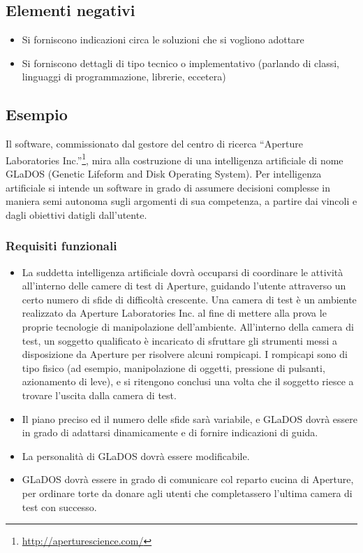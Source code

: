 \documentclass[a4paper,12pt]{report}
\begin{document}
\subsection*{Elementi negativi}
\begin{itemize}
	\item Si forniscono indicazioni circa le soluzioni che si vogliono adottare
	\item Si forniscono dettagli di tipo tecnico o implementativo (parlando di classi, linguaggi di programmazione, librerie, eccetera)
\end{itemize}

\subsection*{Esempio}
Il software, commissionato dal gestore del centro di ricerca ``Aperture Laboratories Inc.''\footnote{\url{http://aperturescience.com/}}, mira alla costruzione di una intelligenza artificiale di nome GLaDOS (Genetic Lifeform and Disk Operating System).
%
Per intelligenza artificiale si intende un software in grado di assumere decisioni complesse in maniera semi autonoma sugli argomenti di sua competenza, a partire dai vincoli e dagli obiettivi datigli dall'utente.

\subsubsection{Requisiti funzionali}
\begin{itemize}
	\item La suddetta intelligenza artificiale dovrà occuparsi di coordinare le attività all'interno
delle camere di test di Aperture, guidando l'utente attraverso un certo numero di sfide di
difficoltà crescente. Una camera di test è un ambiente realizzato da Aperture Laboratories Inc. al
fine di mettere alla prova le proprie tecnologie di manipolazione dell'ambiente. All'interno della
camera di test, un soggetto qualificato è incaricato di sfruttare gli strumenti messi a
disposizione da Aperture per risolvere alcuni rompicapi. I rompicapi sono di tipo fisico (ad
esempio, manipolazione di oggetti, pressione di pulsanti, azionamento di leve), e si ritengono
conclusi una volta che il soggetto riesce a trovare l'uscita dalla camera di test.
	\item Il piano preciso ed il numero delle sfide sarà variabile, e GLaDOS dovrà essere in grado di adattarsi dinamicamente e di fornire indicazioni di guida.
	\item La personalità di GLaDOS dovrà essere modificabile.
	\item GLaDOS dovrà essere in grado di comunicare col reparto cucina di Aperture, per ordinare torte da donare agli utenti che completassero l'ultima camera di test con successo.
\end{itemize}
\end{document}
